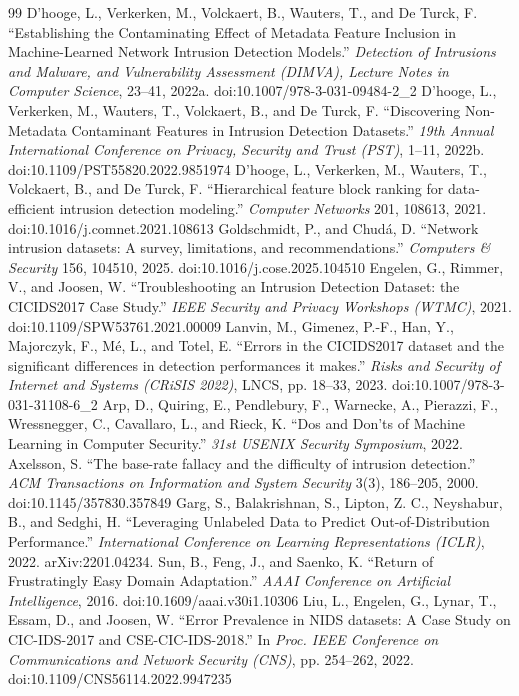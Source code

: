 \documentclass[preprint,12pt]{elsarticle}
\begin{document}
\begin{thebibliography}{99}
 D'hooge, L., Verkerken, M., Volckaert, B., Wauters, T., and De Turck, F. ``Establishing the Contaminating Effect of Metadata Feature Inclusion in Machine-Learned Network Intrusion Detection Models.'' \emph{Detection of Intrusions and Malware, and Vulnerability Assessment (DIMVA), Lecture Notes in Computer Science}, 23--41, 2022a. doi:10.1007/978-3-031-09484-2\_2
 D'hooge, L., Verkerken, M., Wauters, T., Volckaert, B., and De Turck, F. ``Discovering Non-Metadata Contaminant Features in Intrusion Detection Datasets.'' \emph{19th Annual International Conference on Privacy, Security and Trust (PST)}, 1--11, 2022b. doi:10.1109/PST55820.2022.9851974
 D'hooge, L., Verkerken, M., Wauters, T., Volckaert, B., and De Turck, F. ``Hierarchical feature block ranking for data-efficient intrusion detection modeling.'' \emph{Computer Networks} 201, 108613, 2021. doi:10.1016/j.comnet.2021.108613
 Goldschmidt, P., and Chud\'a, D. ``Network intrusion datasets: A survey, limitations, and recommendations.'' \emph{Computers \& Security} 156, 104510, 2025. doi:10.1016/j.cose.2025.104510
 Engelen, G., Rimmer, V., and Joosen, W. ``Troubleshooting an Intrusion Detection Dataset: the CICIDS2017 Case Study.'' \emph{IEEE Security and Privacy Workshops (WTMC)}, 2021. doi:10.1109/SPW53761.2021.00009
 Lanvin, M., Gimenez, P.-F., Han, Y., Majorczyk, F., M\'e, L., and Totel, E. ``Errors in the CICIDS2017 dataset and the significant differences in detection performances it makes.'' \emph{Risks and Security of Internet and Systems (CRiSIS 2022)}, LNCS, pp. 18--33, 2023. doi:10.1007/978-3-031-31108-6\_2
 Arp, D., Quiring, E., Pendlebury, F., Warnecke, A., Pierazzi, F., Wressnegger, C., Cavallaro, L., and Rieck, K. ``Dos and Don'ts of Machine Learning in Computer Security.'' \emph{31st USENIX Security Symposium}, 2022.
 Axelsson, S. ``The base-rate fallacy and the difficulty of intrusion detection.'' \emph{ACM Transactions on Information and System Security} 3(3), 186--205, 2000. doi:10.1145/357830.357849
 Garg, S., Balakrishnan, S., Lipton, Z. C., Neyshabur, B., and Sedghi, H. ``Leveraging Unlabeled Data to Predict Out-of-Distribution Performance.'' \emph{International Conference on Learning Representations (ICLR)}, 2022. arXiv:2201.04234.
 Sun, B., Feng, J., and Saenko, K. ``Return of Frustratingly Easy Domain Adaptation.'' \emph{AAAI Conference on Artificial Intelligence}, 2016. doi:10.1609/aaai.v30i1.10306
 Liu, L., Engelen, G., Lynar, T., Essam, D., and Joosen, W. ``Error Prevalence in NIDS datasets: A Case Study on CIC-IDS-2017 and CSE-CIC-IDS-2018.'' In \emph{Proc. IEEE Conference on Communications and Network Security (CNS)}, pp. 254--262, 2022. doi:10.1109/CNS56114.2022.9947235

\end{thebibliography}
\end{document}
